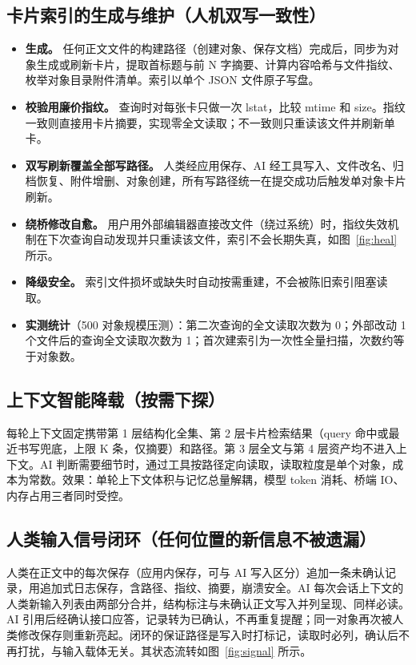 \documentclass[12pt,a4paper]{article}
\begin{document}
\subsection{卡片索引的生成与维护（人机双写一致性）}
\begin{itemize}[leftmargin=2em,itemsep=2pt]
\item \textbf{生成。} 任何正文文件的构建路径（创建对象、保存文档）完成后，同步为对象生成或刷新卡片，提取首标题与前 N 字摘要、计算内容哈希与文件指纹、枚举对象目录附件清单。索引以单个 JSON 文件原子写盘。
\item \textbf{校验用廉价指纹。} 查询时对每张卡只做一次 lstat，比较 mtime 和 size。指纹一致则直接用卡片摘要，实现零全文读取；不一致则只重读该文件并刷新单卡。
\item \textbf{双写刷新覆盖全部写路径。} 人类经应用保存、AI 经工具写入、文件改名、归档恢复、附件增删、对象创建，所有写路径统一在提交成功后触发单对象卡片刷新。
\item \textbf{绕桥修改自愈。} 用户用外部编辑器直接改文件（绕过系统）时，指纹失效机制在下次查询自动发现并只重读该文件，索引不会长期失真，如图~\ref{fig:heal} 所示。
\item \textbf{降级安全。} 索引文件损坏或缺失时自动按需重建，不会被陈旧索引阻塞读取。
\item \textbf{实测统计}（500 对象规模压测）：第二次查询的全文读取次数为 0；外部改动 1 个文件后的查询全文读取次数为 1；首次建索引为一次性全量扫描，次数约等于对象数。
\end{itemize}

\subsection{上下文智能降载（按需下探）}
每轮上下文固定携带第 1 层结构化全集、第 2 层卡片检索结果（query 命中或最近书写兜底，上限 K 条，仅摘要）和路径。第 3 层全文与第 4 层资产均不进入上下文。AI 判断需要细节时，通过工具按路径定向读取，读取粒度是单个对象，成本为常数。效果：单轮上下文体积与记忆总量解耦，模型 token 消耗、桥端 IO、内存占用三者同时受控。

\subsection{人类输入信号闭环（任何位置的新信息不被遗漏）}
人类在正文中的每次保存（应用内保存，可与 AI 写入区分）追加一条未确认记录，用追加式日志保存，含路径、指纹、摘要，崩溃安全。AI 每次会话上下文的人类新输入列表由两部分合并，结构标注与未确认正文写入并列呈现、同样必读。AI 引用后经确认接口应答，记录转为已确认，不再重复提醒；同一对象再次被人类修改保存则重新亮起。闭环的保证路径是写入时打标记，读取时必列，确认后不再打扰，与输入载体无关。其状态流转如图~\ref{fig:signal} 所示。
\end{document}
